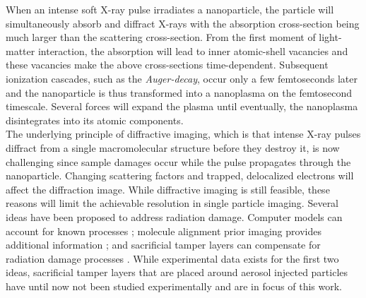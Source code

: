 When an intense soft X-ray pulse irradiates a nanoparticle, the particle will simultaneously absorb and diffract X-rays with the absorption cross-section being much larger than the scattering cross-section. From the first moment of light-matter interaction, the absorption will lead to inner atomic-shell vacancies \citep{Young-2010-Nature} and these vacancies make the above cross-sections time-dependent. Subsequent ionization cascades, such as the \textit{Auger-decay}, occur only a few femtoseconds later and the nanoparticle is thus transformed into a nanoplasma on the femtosecond timescale. Several forces will expand the plasma \citep{Gorkhover-2016-NatPho} until eventually, the nanoplasma disintegrates into its atomic components.\\[1\baselineskip]
%
The underlying principle of diffractive imaging, which is that intense X-ray pulses diffract from a single macromolecular structure before they destroy it, is now challenging since sample damages occur while the pulse propagates through the nanoparticle. Changing scattering factors and trapped, delocalized electrons will affect the diffraction image. While diffractive imaging is still feasible, these reasons will limit the achievable resolution in single particle imaging. Several ideas have been proposed to address radiation damage. Computer models can account for known processes \citep{Quiney-2010-NatPhys}; molecule alignment prior imaging provides additional information \citep{Kupper-2014-PRL}; and sacrificial tamper layers can compensate for radiation damage processes \citep{Hau-Riege-2004-PRE,Hau-Riege-2010-PRL}. While experimental data exists for the first two ideas, sacrificial tamper layers that are placed around aerosol injected particles have until now not been studied experimentally and are in focus of this work.\\[1\baselineskip]
